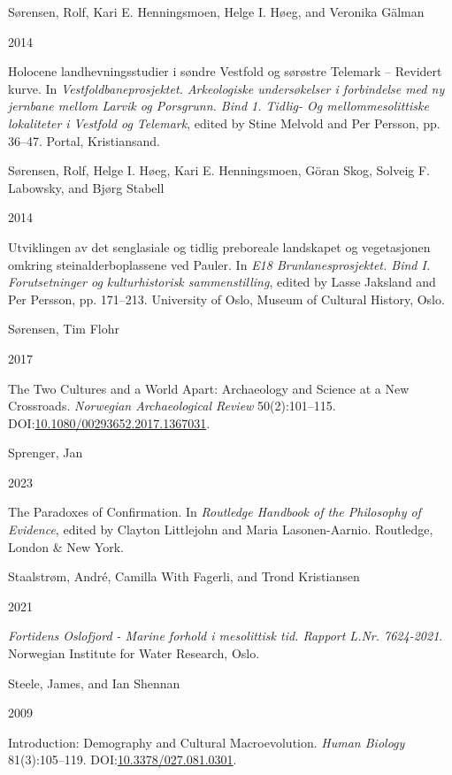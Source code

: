 \documentclass[
  12pt,
  a4paper,
  oneside]{book}
\newlength{\cslhangindent}
\newlength{\csllabelwidth}
\newlength{\cslentryspacingunit} %
\newenvironment{CSLReferences}[2] %
 {%
  \setlength{\parindent}{0pt}
  \ifodd #1
  \let\oldpar\par
  \def\par{\hangindent=\cslhangindent\oldpar}
  \fi
  \setlength{\parskip}{#2\cslentryspacingunit}
 }%
 {}
\newcommand{\CSLBlock}[1]{#1\hfill\break}
\newcommand{\CSLLeftMargin}[1]{\parbox[t]{\csllabelwidth}{#1}}
\newcommand{\CSLRightInline}[1]{\parbox[t]{\linewidth - \csllabelwidth}{#1}\break}
\begin{document}
\begin{CSLReferences}{0}{0}
\leavevmode{}%
\CSLBlock{Sørensen, Rolf, Kari E. Henningsmoen, Helge I. Høeg, and Veronika Gälman}
\CSLLeftMargin{ 2014}%
\CSLRightInline{{Holocene landhevningsstudier i søndre Vestfold og sørøstre Telemark -- Revidert kurve}. In \emph{{Vestfoldbaneprosjektet. Arkeologiske undersøkelser i forbindelse med ny jernbane mellom Larvik og Porsgrunn. Bind 1. Tidlig- Og mellommesolittiske lokaliteter i Vestfold og Telemark}}, edited by Stine Melvold and Per Persson, pp. 36--47. Portal, Kristiansand.}

\leavevmode{}%
\CSLBlock{Sørensen, Rolf, Helge I. Høeg, Kari E. Henningsmoen, Göran Skog, Solveig F. Labowsky, and Bjørg Stabell}
\CSLLeftMargin{ 2014}%
\CSLRightInline{{Utviklingen av det senglasiale og tidlig preboreale landskapet og vegetasjonen omkring steinalderboplassene ved Pauler}. In \emph{{E18 Brunlanesprosjektet. Bind I. Forutsetninger og kulturhistorisk sammenstilling}}, edited by Lasse Jaksland and Per Persson, pp. 171--213. University of Oslo, Museum of Cultural History, Oslo.}

\leavevmode{}%
\CSLBlock{Sørensen, Tim Flohr}
\CSLLeftMargin{ 2017}%
\CSLRightInline{{The Two Cultures and a World Apart: Archaeology and Science at a New Crossroads}. \emph{Norwegian Archaeological Review} 50(2):101--115. DOI:\href{https://doi.org/10.1080/00293652.2017.1367031}{10.1080/00293652.2017.1367031}.}

\leavevmode{}%
\CSLBlock{Sprenger, Jan}
\CSLLeftMargin{ 2023}%
\CSLRightInline{{The Paradoxes of Confirmation}. In \emph{{Routledge Handbook of the Philosophy of Evidence}}, edited by Clayton Littlejohn and Maria Lasonen-Aarnio. Routledge, London \& New York.}

\leavevmode{}%
\CSLBlock{Staalstrøm, André, Camilla With Fagerli, and Trond Kristiansen}
\CSLLeftMargin{ 2021}%
\CSLRightInline{\emph{{Fortidens Oslofjord - Marine forhold i mesolittisk tid. Rapport L.Nr. 7624-2021}}. Norwegian Institute for Water Research, Oslo.}

\leavevmode{}%
\CSLBlock{Steele, James, and Ian Shennan}
\CSLLeftMargin{ 2009}%
\CSLRightInline{{Introduction: Demography and Cultural Macroevolution}. \emph{Human Biology} 81(3):105--119. DOI:\href{https://doi.org/10.3378/027.081.0301}{10.3378/027.081.0301}.}


\end{CSLReferences}
\end{document}
